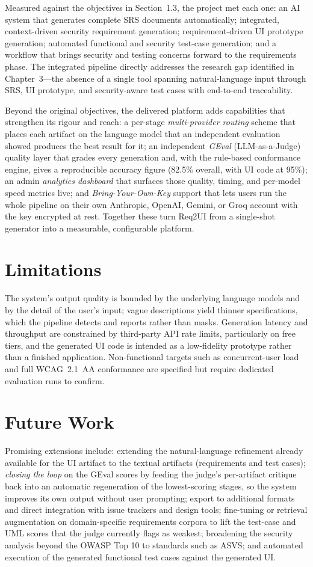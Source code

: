 \documentclass[12pt,a4paper,oneside]{report}
\begin{document}
Measured against the objectives in Section~1.3, the project met each one: an AI system that generates complete SRS documents automatically; integrated, context-driven security requirement generation; requirement-driven UI prototype generation; automated functional and security test-case generation; and a workflow that brings security and testing concerns forward to the requirements phase. The integrated pipeline directly addresses the research gap identified in Chapter~3---the absence of a single tool spanning natural-language input through SRS, UI prototype, and security-aware test cases with end-to-end traceability.

Beyond the original objectives, the delivered platform adds capabilities that strengthen its rigour and reach: a per-stage \emph{multi-provider routing} scheme that places each artifact on the language model that an independent evaluation showed produces the best result for it; an independent \emph{GEval} (LLM-as-a-Judge) quality layer that grades every generation and, with the rule-based conformance engine, gives a reproducible accuracy figure (82.5\% overall, with UI code at 95\%); an admin \emph{analytics dashboard} that surfaces those quality, timing, and per-model speed metrics live; and \emph{Bring-Your-Own-Key} support that lets users run the whole pipeline on their own Anthropic, OpenAI, Gemini, or Groq account with the key encrypted at rest. Together these turn Req2UI from a single-shot generator into a measurable, configurable platform.

\section{Limitations}
The system's output quality is bounded by the underlying language models and by the detail of the user's input; vague descriptions yield thinner specifications, which the pipeline detects and reports rather than masks. Generation latency and throughput are constrained by third-party API rate limits, particularly on free tiers, and the generated UI code is intended as a low-fidelity prototype rather than a finished application. Non-functional targets such as concurrent-user load and full WCAG~2.1~AA conformance are specified but require dedicated evaluation runs to confirm.

\section{Future Work}
Promising extensions include: extending the natural-language refinement already available for the UI artifact to the textual artifacts (requirements and test cases); \emph{closing the loop} on the GEval scores by feeding the judge's per-artifact critique back into an automatic regeneration of the lowest-scoring stages, so the system improves its own output without user prompting; export to additional formats and direct integration with issue trackers and design tools; fine-tuning or retrieval augmentation on domain-specific requirements corpora to lift the test-case and UML scores that the judge currently flags as weakest; broadening the security analysis beyond the OWASP Top 10 to standards such as ASVS; and automated execution of the generated functional test cases against the generated UI.
\end{document}
